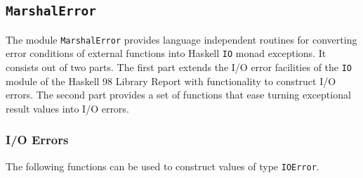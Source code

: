 \documentclass[a4paper,twoside]{article}
\newcommand{\code}[1]{\texttt{#1}}      %
\begin{document}
\subsection{\code{MarshalError}}
\label{sec:MarshalError}

The module \code{MarshalError} provides language independent routines for
converting error conditions of external functions into Haskell \code{IO} monad
exceptions.  It consists out of two parts.  The first part extends the I/O
error facilities of the \code{IO} module of the Haskell 98 Library Report with
functionality to construct I/O errors.  The second part provides a set of
functions that ease turning exceptional result values into I/O errors.

\subsubsection{I/O Errors}
%
The following functions can be used to construct values of type
\code{IOError}.
%
\end{document}
